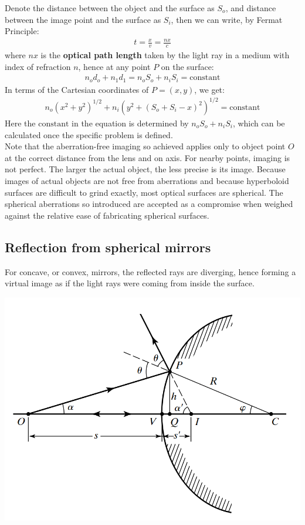 \documentclass[11pt]{book}
\theoremstyle{break}
\theoremstyle{break}
\begin{document}
Denote the distance between the object and the surface as $S_o$, and distance between the image point and the surface as $S_i$, then we can write, by Fermat Principle:
\begin{align*}
t = \frac{x}{v} = \frac{nx}{c} 
\end{align*}
where $nx$ is the \textbf{optical path length} taken by the light ray in a medium with index of refraction $n$, hence at any point $P$ on the surface:
\begin{align*}
n_o d_o + n_1 d_1 = n_o S_o + n_i S_i = \text{constant}
\end{align*}
In terms of the Cartesian coordinates of $P = (x,y)$, we get:
\begin{align*}
n_o (x^2+y^2)^{1/2} + n_i (y^2 + (S_o+S_i - x)^2)^{1/2} = \text{constant}
\end{align*}
Here the $\text{constant}$ in the equation is determined by $n_oS_o + n_i S_i$, which can be calculated once the specific problem is defined.\\

Note that the aberration-free imaging so achieved applies only to object point $O$
at the correct distance from the lens and on axis. For nearby points, imaging is not perfect. The larger the actual object, the less precise is its image. Because images of actual objects are not free from aberrations and because hyperboloid surfaces are difficult to grind exactly, most optical surfaces are spherical. The spherical aberrations so introduced are accepted as a compromise when weighed against the relative ease of fabricating spherical surfaces.

\hfill\break
\subsection*{Reflection from spherical mirrors}
For concave, or convex, mirrors, the reflected rays are diverging, hence forming a virtual image as if the light rays were coming from inside the surface. 
\begin{center}
\includegraphics[scale=0.35]{reflectiveSur.png}
\end{center}
\end{document}
